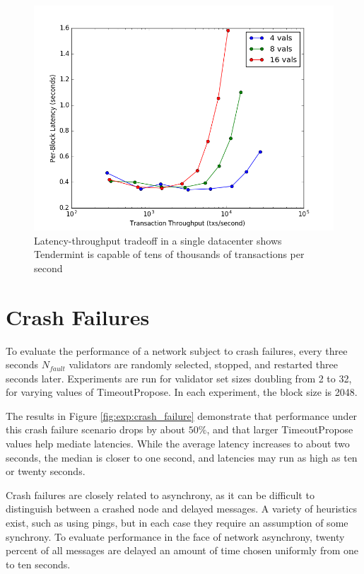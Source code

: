 \begin{figure}[]
	\includegraphics[width=\linewidth,height=\textheight,keepaspectratio]{figures/single_datacenter/latency-throughput.png}
    	\centering
	\caption[Latency-throughput in non-faulty network, single data center]{Latency-throughput tradeoff in a single datacenter shows Tendermint is capable of tens of thousands of transactions per second}
	\label{fig:exp:single}
\end{figure}

\section{Crash Failures}

To evaluate the performance of a network subject to crash failures, every three seconds $N_{fault}$ validators are randomly selected,
stopped, and restarted three seconds later.
Experiments are run for validator set sizes doubling from 2 to 32, for varying values of TimeoutPropose.
In each experiment, the block size is 2048.

The results in Figure \ref{fig:exp:crash_failure} demonstrate that performance under this crash failure scenario drops by about 
$50\%$, and that larger TimeoutPropose values help mediate latencies. While the average latency increases to about two seconds,
the median is closer to one second, and latencies may run as high as ten or twenty seconds.


\ifx
Crash failures are closely related to asynchrony, as it can be difficult to distinguish between a crashed node
and delayed messages. A variety of heuristics exist, such as using pings, 
but in each case they require an assumption of some synchrony. 
To evaluate performance in the face of network asynchrony, twenty percent of all messages are delayed an amount of time chosen uniformly 
from one to ten seconds.
\fi


